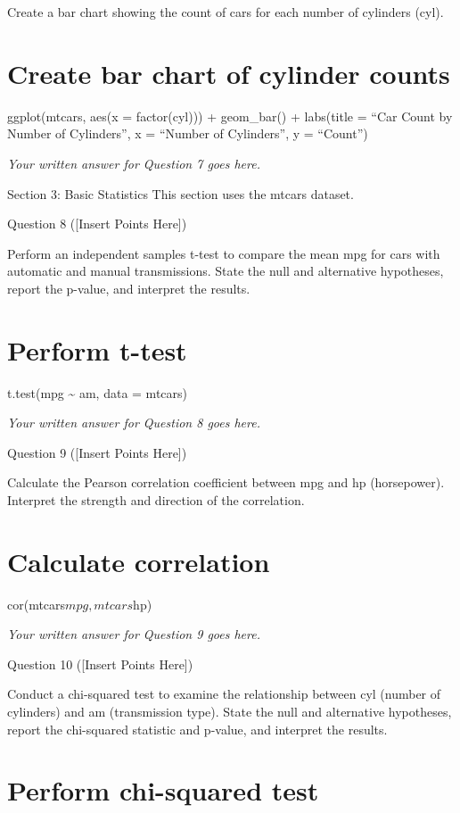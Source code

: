 \documentclass[
  letterpaper,
  DIV=11,
  numbers=noendperiod]{scrartcl}
\begin{document}
Create a bar chart showing the count of cars for each number of
cylinders (cyl).

\section{Create bar chart of cylinder
counts}\label{create-bar-chart-of-cylinder-counts}

ggplot(mtcars, aes(x = factor(cyl))) + geom\_bar() + labs(title = ``Car
Count by Number of Cylinders'', x = ``Number of Cylinders'', y =
``Count'')

\emph{Your written answer for Question 7 goes here.}

Section 3: Basic Statistics This section uses the mtcars dataset.

Question 8 ({[}Insert Points Here{]})

Perform an independent samples t-test to compare the mean mpg for cars
with automatic and manual transmissions. State the null and alternative
hypotheses, report the p-value, and interpret the results.

\section{Perform t-test}\label{perform-t-test}

t.test(mpg \textasciitilde{} am, data = mtcars)

\emph{Your written answer for Question 8 goes here.}

Question 9 ({[}Insert Points Here{]})

Calculate the Pearson correlation coefficient between mpg and hp
(horsepower). Interpret the strength and direction of the correlation.

\section{Calculate correlation}\label{calculate-correlation}

cor(mtcars\(mpg, mtcars\)hp)

\emph{Your written answer for Question 9 goes here.}

Question 10 ({[}Insert Points Here{]})

Conduct a chi-squared test to examine the relationship between cyl
(number of cylinders) and am (transmission type). State the null and
alternative hypotheses, report the chi-squared statistic and p-value,
and interpret the results.

\section{Perform chi-squared test}\label{perform-chi-squared-test}
\end{document}
